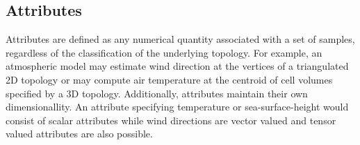 \subsection{Attributes}
Attributes are defined as any numerical quantity associated with a
set of samples, regardless of the classification of the underlying
topology. For example, an atmospheric model may estimate wind
direction at the vertices of a triangulated 2D topology or may compute
air temperature at the centroid of cell volumes specified by a 3D
topology. Additionally, attributes maintain their own
dimensionallity. An attribute specifying temperature or
sea-surface-height would consist of scalar attributes
while wind directions are vector valued and tensor valued attributes
are also possible.
